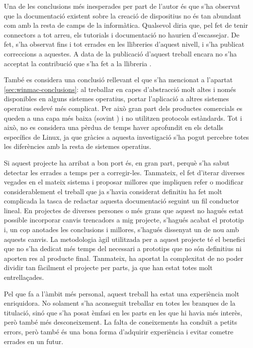 Una de les conclusions més inesperades per part de l'autor és que s'ha
observat que la documentació existent sobre la creació de dispositius
 no és tan abundant com amb la resta de camps de la informàtica.
Qualsevol diria que, pel fet de tenir connectors  a tot arreu,
els tutorials i documentació no haurien d'escassejar. De
fet, s'ha observat fins i tot errades en les llibreries d'aquest nivell, i s'ha
publicat correccions a aquestes. A data de la publicació d'aquest treball encara
no s'ha acceptat la contribució que s'ha fet a la llibreria .

També es considera una conclusió rellevant el que s'ha mencionat a l'apartat
\ref{sec:winmac-conclusions}: al treballar en capes d'abstracció molt altes i
només disponibles en alguns sistemes operatius, portar l'aplicació a altres
sistemes operatius esdevé més complicat. Per això gran part dels productes
comercials es queden a una capa més baixa (sovint ) i no utilitzen
protocols  estàndards. Tot i això, no es considera una pèrdua de temps
haver aprofundit en els detalls específics de Linux, ja que gràcies a aquesta
investigació s'ha pogut percebre totes les diferències amb la resta de sistemes
operatius.

Si aquest projecte ha arribat a bon port és, en gran part, perquè s'ha sabut
detectar les errades a temps per a corregir-les. Tanmateix, el fet d'iterar
diverses vegades en el mateix sistema i proposar millores que
impliquen refer o modificar considerablement el treball que ja s'havia
considerat definitiu ha fet molt complicada la tasca de redactar aquesta
documentació seguint un fil conductor lineal. En projectes de diverses persones
o més grans que aquest no hagués estat possible incorporar canvis trencadors
a mig projecte, s'hagués acabat el prototip i, un cop anotades les conclusions
i millores, s'hagués dissenyat un de nou amb aquests canvis. La metodologia
àgil utilitzada per a aquest projecte té el benefici que no s'ha dedicat més
temps del necessari a prototips que no són definitius ni aporten res al
producte final. Tanmateix, ha aportat la complexitat de no poder dividir tan
fàcilment el projecte per parts, ja que han estat totes molt entrellaçades.

Pel que fa a l'àmbit més personal, aquest treball ha estat una experiència molt
enriquidora. No solament s'ha aconseguit treballar en totes les branques de la
titulació, sinó que s'ha posat èmfasi en les parts en les que hi havia més
interès, però també més desconeixement. La falta de coneixements ha conduït a
petits errors, però també és una bona forma d'adquirir experiència i evitar
cometre errades en un futur.
